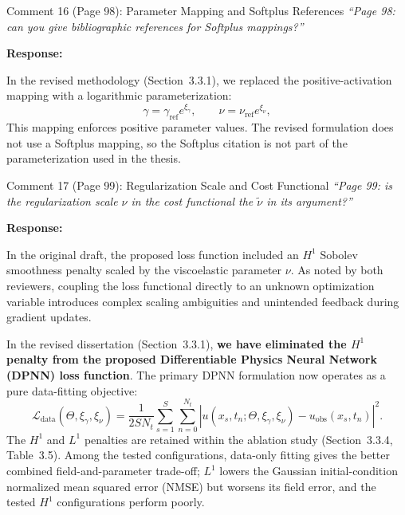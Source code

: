 \documentclass[11pt,a4paper]{article}
\newenvironment{response}{
    \par\vspace{1mm}\noindent\textbf{\textcolor{responseframe}{Response:}}\par\vspace{1mm}
}{
    \par\vspace{3mm}
}
\begin{document}
\vspace{2mm}
\begin{revcomment}{Comment 16 (Page 98): Parameter Mapping and Softplus References}
\emph{``Page 98: can you give bibliographic references for Softplus mappings?''}
\end{revcomment}

\begin{response}
In the revised methodology (Section~3.3.1), we replaced the positive-activation mapping with a logarithmic parameterization:
\[
\gamma = \gamma_{\mathrm{ref}} e^{\xi_\gamma}, \qquad \nu = \nu_{\mathrm{ref}} e^{\xi_\nu},
\]
This mapping enforces positive parameter values. The revised formulation does not use a Softplus mapping, so the Softplus citation is not part of the parameterization used in the thesis.
\end{response}

\vspace{2mm}
\begin{revcomment}{Comment 17 (Page 99): Regularization Scale and Cost Functional}
\emph{``Page 99: is the regularization scale $\nu$ in the cost functional the $\widetilde{\nu}$ in its argument?''}
\end{revcomment}

\begin{response}
In the original draft, the proposed loss function included an $H^1$ Sobolev smoothness penalty scaled by the viscoelastic parameter $\nu$. As noted by both reviewers, coupling the loss functional directly to an unknown optimization variable introduces complex scaling ambiguities and unintended feedback during gradient updates.

In the revised dissertation (Section~3.3.1), \textbf{we have eliminated the $H^1$ penalty from the proposed Differentiable Physics Neural Network (DPNN) loss function}. The primary DPNN formulation now operates as a pure data-fitting objective:
\[
\mathcal{L}_{\mathrm{data}}(\Theta, \xi_\gamma, \xi_\nu) = \frac{1}{2 S N_t} \sum_{s=1}^S \sum_{n=0}^{N_t} \left| u(x_s, t_n; \Theta, \xi_\gamma, \xi_\nu) - u_{\mathrm{obs}}(x_s, t_n) \right|^2.
\]
The $H^1$ and $L^1$ penalties are retained within the ablation study (Section~3.3.4, Table~3.5). Among the tested configurations, data-only fitting gives the better combined field-and-parameter trade-off; $L^1$ lowers the Gaussian initial-condition normalized mean squared error (NMSE) but worsens its field error, and the tested $H^1$ configurations perform poorly.
\end{response}
\end{document}
